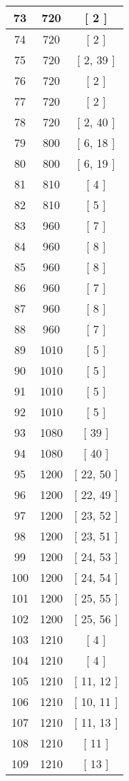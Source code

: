 \begin{center}
\begin{longtable}[H]{|| c c c ||}
73 & 720 & [ 2 ] \\ 
\hline
74 & 720 & [ 2 ] \\ 
\hline
75 & 720 & [ 2, 39 ] \\ 
\hline
76 & 720 & [ 2 ] \\ 
\hline
77 & 720 & [ 2 ] \\ 
\hline
78 & 720 & [ 2, 40 ] \\ 
\hline
79 & 800 & [ 6, 18 ] \\ 
\hline
80 & 800 & [ 6, 19 ] \\ 
\hline
81 & 810 & [ 4 ] \\ 
\hline
82 & 810 & [ 5 ] \\ 
\hline
83 & 960 & [ 7 ] \\ 
\hline
84 & 960 & [ 8 ] \\ 
\hline
85 & 960 & [ 8 ] \\ 
\hline
86 & 960 & [ 7 ] \\ 
\hline
87 & 960 & [ 8 ] \\ 
\hline
88 & 960 & [ 7 ] \\ 
\hline
89 & 1010 & [ 5 ] \\ 
\hline
90 & 1010 & [ 5 ] \\ 
\hline
91 & 1010 & [ 5 ] \\ 
\hline
92 & 1010 & [ 5 ] \\ 
\hline
93 & 1080 & [ 39 ] \\ 
\hline
94 & 1080 & [ 40 ] \\ 
\hline
95 & 1200 & [ 22, 50 ] \\ 
\hline
96 & 1200 & [ 22, 49 ] \\ 
\hline
97 & 1200 & [ 23, 52 ] \\ 
\hline
98 & 1200 & [ 23, 51 ] \\ 
\hline
99 & 1200 & [ 24, 53 ] \\ 
\hline
100 & 1200 & [ 24, 54 ] \\ 
\hline
101 & 1200 & [ 25, 55 ] \\ 
\hline
102 & 1200 & [ 25, 56 ] \\ 
\hline
103 & 1210 & [ 4 ] \\ 
\hline
104 & 1210 & [ 4 ] \\ 
\hline
105 & 1210 & [ 11, 12 ] \\ 
\hline
106 & 1210 & [ 10, 11 ] \\ 
\hline
107 & 1210 & [ 11, 13 ] \\ 
\hline
108 & 1210 & [ 11 ] \\ 
\hline
109 & 1210 & [ 13 ] \\ 

\end{longtable}
\end{center}
